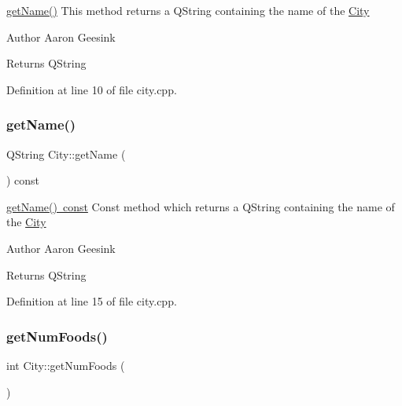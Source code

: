 \mbox{\hyperlink{class_city_afe733410d61155d8a4013293b0b72408}{get\+Name()}} This method returns a Q\+String containing the name of the \mbox{\hyperlink{class_city}{City}} 

\begin{DoxyAuthor}{Author}
Aaron Geesink 
\end{DoxyAuthor}
\begin{DoxyReturn}{Returns}
Q\+String 
\end{DoxyReturn}


Definition at line 10 of file city.\+cpp.

\mbox{\label{class_city_ad73598d937870a165cb530958106ff07}} 
\subsubsection{\texorpdfstring{getName()}{getName()}\hspace{0.1cm}{\footnotesize\ttfamily [2/2]}}
{\footnotesize\ttfamily Q\+String City\+::get\+Name (\begin{DoxyParamCaption}{ }\end{DoxyParamCaption}) const}



\mbox{\hyperlink{class_city_ad73598d937870a165cb530958106ff07}{get\+Name() const}} Const method which returns a Q\+String containing the name of the \mbox{\hyperlink{class_city}{City}} 

\begin{DoxyAuthor}{Author}
Aaron Geesink 
\end{DoxyAuthor}
\begin{DoxyReturn}{Returns}
Q\+String 
\end{DoxyReturn}


Definition at line 15 of file city.\+cpp.

\mbox{\label{class_city_a1462a90a0d40e0d946903b1db214da0e}} 
\subsubsection{\texorpdfstring{getNumFoods()}{getNumFoods()}}
{\footnotesize\ttfamily int City\+::get\+Num\+Foods (\begin{DoxyParamCaption}{ }\end{DoxyParamCaption})}



